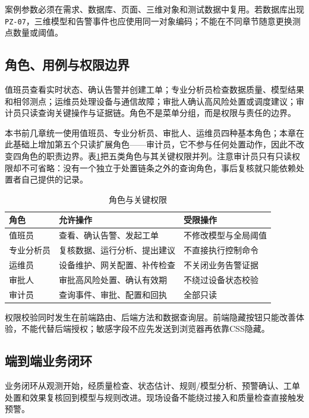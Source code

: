 案例参数必须在需求、数据库、页面、三维对象和测试数据中复用。若数据库出现\texttt{PZ-07}，三维模型和告警事件也应使用同一对象编码；不能在不同章节随意更换测点数量或阈值。

\subsection{角色、用例与权限边界}

值班员查看实时状态、确认告警并创建工单；专业分析员检查数据质量、模型结果和相邻测点；运维员处理设备与通信故障；审批人确认高风险处置或调度建议；审计员只读查询关键操作与证据链。角色不是菜单分组，而是权限与责任的边界。

本书前几章统一使用值班员、专业分析员、审批人、运维员四种基本角色；本章在此基础上增加第五个只读扩展角色——审计员，它不参与任何处置动作，因此不改变四角色的职责边界。表\ref{tab:case-roles}把五类角色与其关键权限并列。注意审计员只有只读权限却不可省略：没有一个独立于处置链条之外的查询角色，事后复核就只能依赖处置者自己提供的记录。

\begin{table}[htbp]
\centering
\caption{角色与关键权限}
\label{tab:case-roles}
\begin{tabular}{p{2.3cm}p{4.8cm}p{5.2cm}}
\toprule
角色 & 允许操作 & 受限操作 \\
\midrule
值班员 & 查看、确认告警、发起工单 & 不修改模型与全局阈值 \\
专业分析员 & 复核数据、运行分析、提出建议 & 不直接执行控制命令 \\
运维员 & 设备维护、网关配置、补传检查 & 不关闭业务告警证据 \\
审批人 & 审批高风险处置、确认有效期 & 不绕过设备状态校验 \\
审计员 & 查询事件、审批、配置和回执 & 全部只读 \\
\bottomrule
\end{tabular}
\end{table}

权限校验同时发生在前端路由、后端方法和数据查询层。前端隐藏按钮只能改善体验，不能代替后端授权；敏感字段不应先发送到浏览器再依靠CSS隐藏。

\subsection{端到端业务闭环}

业务闭环从观测开始，经质量检查、状态估计、规则/模型分析、预警确认、工单处置和效果复核回到模型与规则改进。现场设备不能绕过接入和质量检查直接触发预警。

